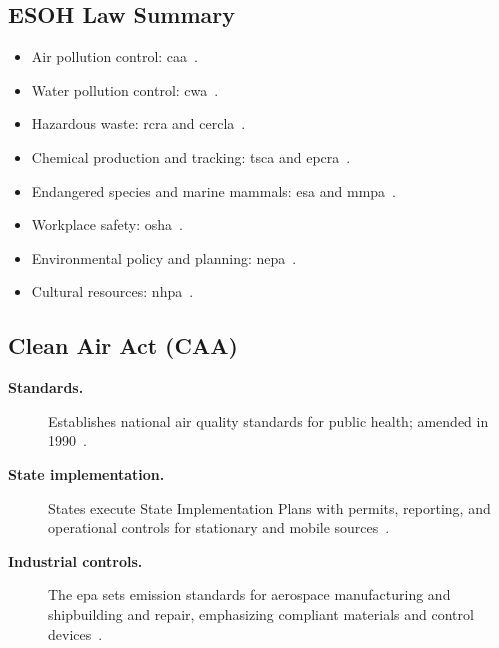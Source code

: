 \documentclass[../main.tex]{subfiles}
\begin{document}
\subsection{ESOH Law Summary}
\begin{itemize}
  \item Air pollution control: \ac{caa}~\autocite{edo-3-3-7-environmental-requirements-2025}.
  \item Water pollution control: \ac{cwa}~\autocite{edo-3-3-7-environmental-requirements-2025}.
  \item Hazardous waste: \ac{rcra} and \ac{cercla}~\autocite{edo-3-3-7-environmental-requirements-2025}.
  \item Chemical production and tracking: \ac{tsca} and \ac{epcra}~\autocite{edo-3-3-7-environmental-requirements-2025}.
  \item Endangered species and marine mammals: \ac{esa} and \ac{mmpa}~\autocite{edo-3-3-7-environmental-requirements-2025}.
  \item Workplace safety: \ac{osha}~\autocite{edo-3-3-7-environmental-requirements-2025}.
  \item Environmental policy and planning: \ac{nepa}~\autocite{edo-3-3-7-environmental-requirements-2025}.
  \item Cultural resources: \ac{nhpa}~\autocite{edo-3-3-7-environmental-requirements-2025}.
\end{itemize}

\subsection{Clean Air Act (CAA)}
\begin{description}
  \item[\textbf{Standards.}] Establishes national air quality standards for public health; amended in 1990~\autocite{edo-3-3-7-environmental-requirements-2025}.
  \item[\textbf{State implementation.}] States execute State Implementation Plans with permits, reporting, and operational controls for stationary and mobile sources~\autocite{edo-3-3-7-environmental-requirements-2025}.
  \item[\textbf{Industrial controls.}] The \ac{epa} sets emission standards for aerospace manufacturing and shipbuilding and repair, emphasizing compliant materials and control devices~\autocite{edo-3-3-7-environmental-requirements-2025}.
\end{description}
\end{document}
